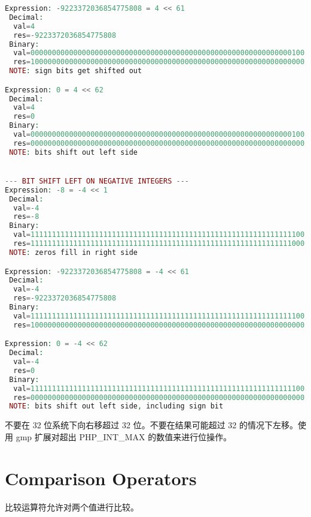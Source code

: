 \begin{lstlisting}[language=PHP]
Expression: -9223372036854775808 = 4 << 61
 Decimal:
  val=4
  res=-9223372036854775808
 Binary:
  val=0000000000000000000000000000000000000000000000000000000000000100
  res=1000000000000000000000000000000000000000000000000000000000000000
 NOTE: sign bits get shifted out

Expression: 0 = 4 << 62
 Decimal:
  val=4
  res=0
 Binary:
  val=0000000000000000000000000000000000000000000000000000000000000100
  res=0000000000000000000000000000000000000000000000000000000000000000
 NOTE: bits shift out left side


--- BIT SHIFT LEFT ON NEGATIVE INTEGERS ---
Expression: -8 = -4 << 1
 Decimal:
  val=-4
  res=-8
 Binary:
  val=1111111111111111111111111111111111111111111111111111111111111100
  res=1111111111111111111111111111111111111111111111111111111111111000
 NOTE: zeros fill in right side

Expression: -9223372036854775808 = -4 << 61
 Decimal:
  val=-4
  res=-9223372036854775808
 Binary:
  val=1111111111111111111111111111111111111111111111111111111111111100
  res=1000000000000000000000000000000000000000000000000000000000000000

Expression: 0 = -4 << 62
 Decimal:
  val=-4
  res=0
 Binary:
  val=1111111111111111111111111111111111111111111111111111111111111100
  res=0000000000000000000000000000000000000000000000000000000000000000
 NOTE: bits shift out left side, including sign bit
\end{lstlisting}


不要在 32 位系统下向右移超过 32 位。不要在结果可能超过 32 的情况下左移。使用 gmp 扩展对超出 PHP\_INT\_MAX 的数值来进行位操作。








\section{Comparison Operators}

比较运算符允许对两个值进行比较。


